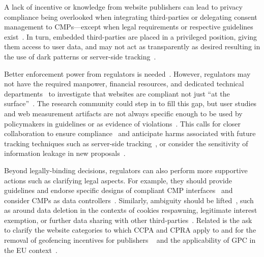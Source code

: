 

 A lack of incentive or knowledge from website publishers can lead to privacy compliance being overlooked when integrating third-parties or delegating consent management to CMPs---except when legal requirements or respective guidelines exist~\cite{utzPrivacyRarelyConsidered2023,Stov-etal-23-PETs}. In turn, embedded third-parties are placed in a privileged position, giving them access to user data, and may not act as transparently as desired resulting in the use of dark patterns or server-side tracking~\cite{tothDarkPatternsManipulation2022,grayDarkPatternsLegal2021,mehrnezhadHowCanWould2022}.

 Better enforcement power from regulators is needed~\cite{bollingerAutomatingCookieConsent2022,vannortwickSettingBarLow2022,mehrnezhadHowCanWould2022,motiTargetedTroublesomeTracking2024}. However, regulators may not have the required manpower, financial resources, and dedicated technical departments~\cite{edpbContributionEDPBReport2023} to investigate that websites are compliant not just ``at the surface''~\cite{kyiInvestigatingDeceptiveDesign2023}. The research community could step in to fill this gap, but user studies and web measurement artifacts are not always specific enough to be used by policymakers in guidelines or as evidence of violations~\cite{bielovaEffectDesignPatterns2024,Bielova2024-zr,bouhoulaAutomatedLargeScaleAnalysis2024}.
This calls for closer collaboration to ensure compliance~\cite{saemannInvestigatingGDPRFines2022} and anticipate harms associated with future tracking techniques such as server-side tracking~\cite{fouadDevilDetailsDetection2024,cuiUnderstandingPrivacyNorms2025,tothDarkPatternsManipulation2022}, or consider the sensitivity of information leakage in new proposals~\cite{hoganMakingSensePrivate2026}.

Beyond legally-binding decisions, regulators can also perform more supportive actions such as clarifying legal aspects. For example, they should provide guidelines and endorse specific designs of compliant CMP interfaces~\cite{fouadMyCookiePhoenix2022,hosseiniBilingualLongitudinalAnalysis2024,hilsMeasuringEmergenceConsent2020,matteCookieBannersRespect2020,mehrnezhadHowCanWould2022} and consider CMPs as data controllers~\cite{papadogiannakisUserTrackingPostcookie2021,tothDarkPatternsManipulation2022}. Similarly, ambiguity should be lifted~\cite{hosseiniBilingualLongitudinalAnalysis2024,azizJohnnyStillCant2024}, such as around data deletion in the contexts of cookies respawning, legitimate interest exemption, or further data sharing with other third-parties~\cite{fouadMyCookiePhoenix2022,ruppLeaveNoData2022,ruppLeaveNoData2022}. Related is the ask to clarify the website categories to which CCPA and CPRA apply to
and for the removal of geofencing incentives for publishers
~\cite{vannortwickSettingBarLow2022,azizJohnnyStillCant2024,charatanTwoStepsForward2024} and the applicability of GPC in the EU context~\cite{zimmeckUsabilityEnforceabilityGlobal2023,zimmeckGeneralizableActivePrivacy2024,azizJohnnyStillCant2024}.

